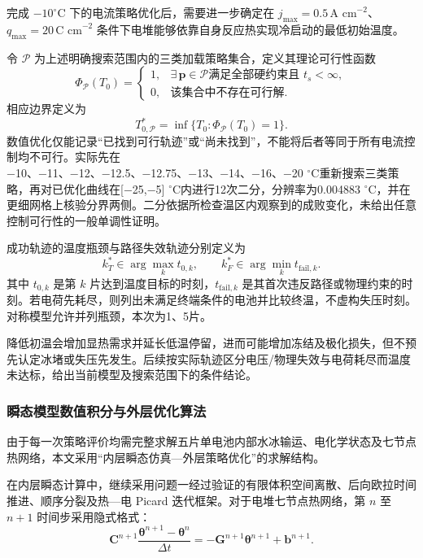 \documentclass[bwprint]{gmcmthesis}
\numberwithin{equation}{section}
\numberwithin{figure}{section}
\begin{document}
 完成 \(-10^\circ\text{C}\) 下的电流策略优化后，需要进一步确定在 \(j_{\text{max}} = 0.5 \, \text{A cm}^{-2}\)、\(q_{\text{max}} = 20 \, \text{C cm}^{-2}\) 条件下电堆能够依靠自身反应热实现冷启动的最低初始温度。

令 $\mathcal P$ 为上述明确搜索范围内的三类加载策略集合，定义其理论可行性函数
\begin{equation}
\Phi_{\mathcal P}(T_0)=\begin{cases}1,&\exists\,\mathbf p\in\mathcal P\text{满足全部硬约束且 }t_s<\infty,\\0,&\text{该集合中不存在可行解}.\end{cases}\label{eq:src:5-65}
\end{equation}
相应边界定义为
\begin{equation}
T_{0,\mathcal P}^{*}=\inf\{T_0:\Phi_{\mathcal P}(T_0)=1\}.\label{eq:src:5-66}
\end{equation}
数值优化仅能记录“已找到可行轨迹”或“尚未找到”，不能将后者等同于所有电流控制均不可行。实际先在−10、−11、−12、−12.5、−12.75、−13、−14、−16、−20 $^\circ\mathrm C$重新搜索三类策略，再对已优化曲线在[−25,−5] $^\circ\mathrm C$内进行12次二分，分辨率为0.004883 $^\circ\mathrm C$，并在更细网格上核验分界两侧。二分依据所检查温区内观察到的成败变化，未给出任意控制可行性的一般单调性证明。

成功轨迹的温度瓶颈与路径失效轨迹分别定义为
\begin{equation}
k_T^*\in\arg\max_k t_{0,k},\qquad k_F^*\in\arg\min_k t_{\mathrm{fail},k}.\label{eq:src:5-67}
\end{equation}
其中 $t_{0,k}$ 是第 $k$ 片达到温度目标的时刻，$t_{\mathrm{fail},k}$ 是其首次违反路径或物理约束的时刻。若电荷先耗尽，则列出未满足终端条件的电池并比较终温，不虚构失压时刻。对称模型允许并列瓶颈，本次为1、5片。

降低初温会增加显热需求并延长低温停留，进而可能增加冻结及极化损失，但不预先认定冰堵或失压先发生。后续按实际轨迹区分电压/物理失效与电荷耗尽而温度未达标，给出当前模型及搜索范围下的条件结论。

\subsubsection{瞬态模型数值积分与外层优化算法}

 由于每一次策略评价均需完整求解五片单电池内部水冰输运、电化学状态及七节点热网络，本文采用“内层瞬态仿真—外层策略优化”的求解结构。

 在内层瞬态计算中，继续采用问题一经过验证的有限体积空间离散、后向欧拉时间推进、顺序分裂及热—电 Picard 迭代框架。对于电堆七节点热网络，第 \(n\) 至 \(n+1\) 时间步采用隐式格式：
\begin{equation}
\mathbf{C}^{n+1} \frac{\boldsymbol{\theta}^{n+1} - \boldsymbol{\theta}^n}{\Delta t} = -\mathbf{G}^{n+1} \boldsymbol{\theta}^{n+1} + \mathbf{b}^{n+1}. \label{eq:src:5-70}
\end{equation}
\end{document}
